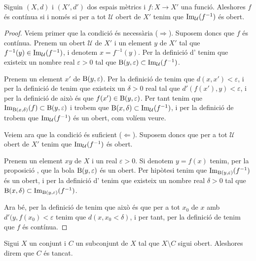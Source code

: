 \documentclass[../Apunts.tex]{subfiles}
\begin{document}
	\begin{theorem}
		Siguin \((X,d)\) i \((X',d')\) dos espais mètrics i \(f\colon X\longrightarrow X'\) una funció. Aleshores \(f\) és contínua si i només si per a tot \(\mathcal{U}\) obert de \(X'\) tenim que \(\operatorname*{Im}_{\mathcal{U}}(f^{-1})\) és obert.
		\begin{proof}
			Veiem primer que la condició és necessària (\(\Rightarrow\)). Suposem doncs que \(f\) és contínua. Prenem un obert \(\mathcal{U}\) de \(X'\) i un element \(y\) de \(X'\) tal que \(f^{-1}(y)\in\operatorname*{Im}_{\mathcal{U}}(f^{-1})\), i denotem \(x=f^{-1}(y)\). Per la definició d' tenim que existeix un nombre real \(\varepsilon>0\) tal que \(\operatorname{B}(y,\varepsilon)\subset\operatorname*{Im}_{\mathcal{U}}(f^{-1})\).
			
			Prenem un element \(x'\) de \(\operatorname{B}(y,\varepsilon)\). Per la definició de  tenim que \(d(x,x')<\varepsilon\), i per la definició de  tenim que existeix un \(\delta>0\) real tal que \(d'(f(x'),y)<\varepsilon\), i per la definició de  això és que \(f(x')\in\operatorname{B}(y,\varepsilon)\). Per tant tenim que \(\operatorname*{Im}_{\operatorname{B}(x,\delta)}(f)\subset\operatorname{B}(y,\varepsilon)\) i trobem que \(\operatorname{B}(x,\delta)\subset\operatorname*{Im}_{\mathcal{U}}(f^{-1})\), i per la definició de  trobem que \(\operatorname*{Im}_{\mathcal{U}}(f^{-1})\) és un obert, com volíem veure.
			
			Veiem ara que la condició és suficient (\(\Leftarrow\)). Suposem doncs que per a tot \(\mathcal{U}\) obert de \(X'\) tenim que \(\operatorname*{Im}_{\mathcal{U}}(f^{-1})\) és obert.
			
			Prenem un element \(xy\) de \(X\) i un real \(\varepsilon>0\). Si denotem \(y=f(x)\) tenim, per la proposició , que la bola \(\operatorname{B}(y,\varepsilon)\) és un obert. Per hipòtesi tenim que \(\operatorname*{Im}_{\operatorname{B}(y,\varepsilon)}(f^{-1})\) és un obert, i per la definició d' tenim que existeix un nombre real \(\delta>0\) tal que \(\operatorname{B}(x,\delta)\subset\operatorname*{Im}_{\operatorname{B}(y,\varepsilon)}(f^{-1})\).
			
			Ara bé, per la definició de  tenim que això és que per a tot \(x_{0}\) de \(x\) amb \(d'(y,f(x_{0})<\varepsilon\) tenim que \(d(x,x_{0}<\delta)\), i per tant, per la definició de  tenim que \(f\) és contínua.
		\end{proof}
	\end{theorem}
	\begin{definition}[Tancat]
		\label{def:tancat}
		Sigui \(X\) un conjunt i \(C\) un subconjunt de \(X\) tal que \(X\setminus C\) sigui obert. Aleshores direm que \(C\) és tancat.
	\end{definition}
\end{document}
